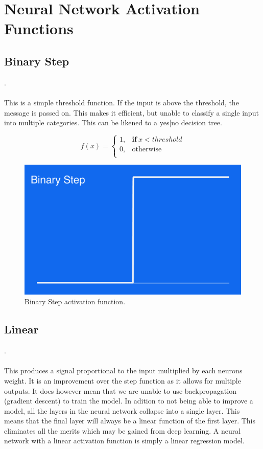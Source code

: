 \chapter{Neural Network Activation Functions}\label{appendix:activation}


\section{Binary Step}.\\\\
This is a simple threshold function. If the input is above the threshold, the message is passed on. This makes it efficient, but unable to classify a single input into multiple categories. This can be likened to a yes|no decision tree.

\begin{equation}
f(x) =
    \begin{cases}
      1 , & \mathbf{if} \ x < threshold \\
      0 , & \text{otherwise}\\

    \end{cases}
  \end{equation}

\begin{figure}[H]
\centering
\includegraphics[width=.265\textwidth]{4fig/binary.png}
\caption{Binary Step activation function.}
\end{figure}



\section{Linear}.\\\\

This produces a signal proportional to the input multiplied by each neurons weight. It is an improvement over the step function as it allows for multiple outputs. It does however mean that we are unable to use backpropagation (gradient descent) to train the model. In adition to not being able to improve a model, all the layers in the neural network collapse into a single layer. This means that the final layer will always be a linear function of the first layer. This eliminates all the merits which may be gained from deep learning. A neural network with a linear activation function is simply a linear regression model.

